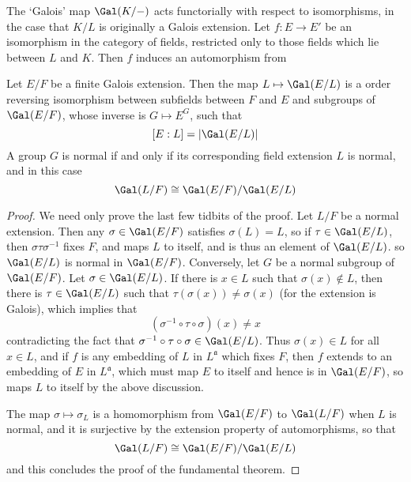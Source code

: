 The `Galois' map $\Gal(K/-)$ acts functorially with respect to isomorphisms, in the case that $K/L$ is originally a Galois extension. Let $f: E \to E'$ be an isomorphism in the category of fields, restricted only to those fields which lie between $L$ and $K$. Then $f$ induces an automorphism from


\begin{theorem}
    Let $E/F$ be a finite Galois extension. Then the map $L \mapsto \Gal(E/L)$ is a order reversing isomorphism between subfields between $F$ and $E$ and subgroups of $\Gal(E/F)$, whose inverse is $G \mapsto E^G$, such that
    \[ [E:L] = |\Gal(E/L)| \]
    A group $G$ is normal if and only if its corresponding field extension $L$ is normal, and in this case
    \[ \Gal(L/F) \cong \Gal(E/F)/\Gal(E/L) \]
\end{theorem}
\begin{proof}
    We need only prove the last few tidbits of the proof. Let $L/F$ be a normal extension. Then any $\sigma \in \Gal(E/F)$ satisfies $\sigma(L) = L$, so if $\tau \in \Gal(E/L)$, then $\sigma \tau \sigma^{-1}$ fixes $F$, and maps $L$ to itself, and is thus an element of $\Gal(E/L)$. so $\Gal(E/L)$ is normal in $\Gal(E/F)$. Conversely, let $G$ be a normal subgroup of $\Gal(E/F)$. Let $\sigma \in \Gal(E/L)$. If there is $x \in L$ such that $\sigma(x) \not \in L$, then there is $\tau \in \Gal(E/L)$ such that $\tau(\sigma(x)) \neq \sigma(x)$ (for the extension is Galois), which implies that
    \[ (\sigma^{-1} \circ \tau \circ \sigma)(x) \neq x \]
    contradicting the fact that $\sigma^{-1} \circ \tau \circ \sigma \in \Gal(E/L)$. Thus $\sigma(x) \in L$ for all $x \in L$, and if $f$ is any embedding of $L$ in $L^\mathfrak{a}$ which fixes $F$, then $f$ extends to an embedding of $E$ in $L^\mathfrak{a}$, which must map $E$ to itself and hence is in $\Gal(E/F)$, so maps $L$ to itself by the above discussion.

    The map $\sigma \mapsto \sigma_L$ is a homomorphism from $\Gal(E/F)$ to $\Gal(L/F)$ when $L$ is normal, and it is surjective by the extension property of automorphisms, so that
    \[ \Gal(L/F) \cong \Gal(E/F)/\Gal(E/L) \]
    and this concludes the proof of the fundamental theorem.
\end{proof}

